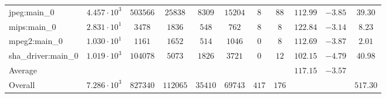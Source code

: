 \begin{tabular}{|l|c|c|c|c|c|c|c|c|c|c|}
jpeg:main\_0            & $ 4.457 \cdot 10^{3} $ & $ 503566 $ & $ 25838  $ & $ 8309  $ & $ 15204 $ & $ 8   $ & $ 88  $ & $ 112.99      $ & $ -3.85   $ & $ 39.30   $ \\
mips:main\_0            & $ 2.831 \cdot 10^{1} $ & $ 3478   $ & $ 1836   $ & $ 548   $ & $ 762   $ & $ 8   $ & $ 8   $ & $ 122.84      $ & $ -3.14   $ & $ 8.23    $ \\
mpeg2:main\_0           & $ 1.030 \cdot 10^{1} $ & $ 1161   $ & $ 1652   $ & $ 514   $ & $ 1046  $ & $ 0   $ & $ 8   $ & $ 112.69      $ & $ -3.87   $ & $ 2.01    $ \\
sha\_driver:main\_0     & $ 1.019 \cdot 10^{3} $ & $ 104078 $ & $ 5073   $ & $ 1826  $ & $ 3721  $ & $ 0   $ & $ 12  $ & $ 102.15      $ & $ -4.79   $ & $ 40.98   $ \\
\hline
Average                 & $                    $ & $        $ & $        $ & $       $ & $       $ & $     $ & $     $ & $ 117.15      $ & $ -3.57   $ & $         $ \\
\hline
Overall                 & $ 7.286 \cdot 10^{3} $ & $ 827340 $ & $ 112065 $ & $ 35410 $ & $ 69743 $ & $ 417 $ & $ 176 $ & $             $ & $         $ & $ 517.30  $ \\
\hline
\end{tabular}
